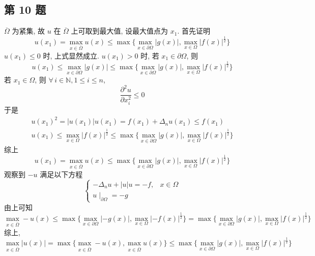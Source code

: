 \documentclass[../main.tex]{subfiles}
\begin{document}
\subsection{第 10 题}
$\overline{\Omega}$ 为紧集, 故 $u$ 在 $\overline{\Omega}$ 上可取到最大值, 设最大值点为 $x_1$.
首先证明
\[
    u \left( x_1 \right)
    =
    \max_{x \in \overline{\Omega}} u \left( x \right)
    \leqslant
    \max \{ \max_{x \in \partial \Omega} \left| g \left( x \right) \right|, \max_{x \in \Omega} \left| f \left( x \right) \right|^{\frac{1}{2}} \}
\]
$u \left( x_1 \right) \leqslant 0$ 时, 上式显然成立.
$u \left( x_1 \right) > 0$ 时, 若 $x_1 \in \partial \Omega$, 则
\[
    u \left( x_1 \right)
    \leqslant
    \max_{x \in \partial \Omega} \left| g \left( x \right) \right|
    \leqslant
    \max \{ \max_{x \in \partial \Omega} \left| g \left( x \right) \right|, \max_{x \in \Omega} \left| f \left( x \right) \right|^{\frac{1}{2}} \}
\]
若 $x_1 \in \Omega$, 则 $\forall \, i \in \mathbb{N}, 1 \leqslant i \leqslant n$,
\[
    \frac{\partial^2 u}{\partial x_i^2} \leqslant 0
\]
于是
\begin{gather*}
    u \left( x_1 \right)^2
    =
    \left| u \left( x_1 \right) \right| u \left( x_1 \right)
    =
    f \left( x_1 \right) + \Delta_n u \left( x_1 \right)
    \leqslant
    f \left( x_1 \right) \\
    u \left( x_1 \right)
    \leqslant
    \max_{x \in \Omega} \left| f \left( x \right) \right|^{\frac{1}{2}}
    \leqslant
    \max \{ \max_{x \in \partial \Omega} \left| g \left( x \right) \right|, \max_{x \in \Omega} \left| f \left( x \right) \right|^{\frac{1}{2}} \}
\end{gather*}
综上
\[
    u \left( x_1 \right)
    =
    \max_{x \in \overline{\Omega}} u \left( x \right)
    \leqslant
    \max \{ \max_{x \in \partial \Omega} \left| g \left( x \right) \right|, \max_{x \in \Omega} \left| f \left( x \right) \right|^{\frac{1}{2}} \}
\]
观察到 $- u$ 满足以下方程
\[
    \begin{cases}
        - \Delta_n u + \left| u \right| u = - f, & x \in \Omega \\
        u \mid_{\partial \Omega} = - g
    \end{cases}
\]
由上可知
\[
    \max_{x \in \overline{\Omega}} - u \left( x \right)
    \leqslant
    \max \{ \max_{x \in \partial \Omega} \left| - g \left( x \right) \right|, \max_{x \in \Omega} \left| - f \left( x \right) \right|^{\frac{1}{2}} \}
    =
    \max \{ \max_{x \in \partial \Omega} \left| g \left( x \right) \right|, \max_{x \in \Omega} \left| f \left( x \right) \right|^{\frac{1}{2}} \}
\]
综上,
\[
    \max_{x \in \overline{\Omega}} \left| u \left( x \right) \right|
    =
    \max \{ \max_{x \in \overline{\Omega}} - u \left( x \right), \max_{x \in \overline{\Omega}} u \left( x \right) \}
    \leqslant
    \max \{ \max_{x \in \partial \Omega} \left| g \left( x \right) \right|, \max_{x \in \Omega} \left| f \left( x \right) \right|^{\frac{1}{2}} \}
\]
\end{document}
